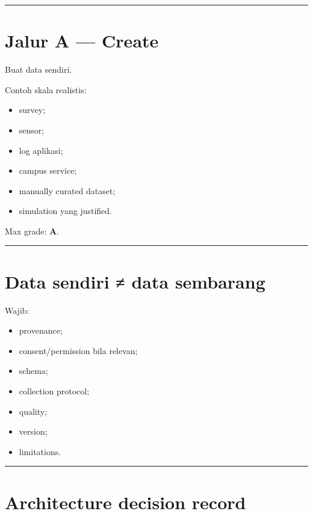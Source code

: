 \documentclass[
  indonesian,
  letterpaper,
  DIV=11,
  numbers=noendperiod]{scrreprt}
\providecommand{\tightlist}{%
  \setlength{\itemsep}{0pt}\setlength{\parskip}{0pt}}
\begin{document}
\begin{center}\rule{0.5\linewidth}{0.5pt}\end{center}

\section{Jalur A --- Create}\label{jalur-a-create-1}

Buat data sendiri.

Contoh skala realistis:

\begin{itemize}
\tightlist
\item
  survey;
\item
  sensor;
\item
  log aplikasi;
\item
  campus service;
\item
  manually curated dataset;
\item
  simulation yang justified.
\end{itemize}

Max grade: \textbf{A}.

\begin{center}\rule{0.5\linewidth}{0.5pt}\end{center}

\section{Data sendiri ≠ data
sembarang}\label{data-sendiri-data-sembarang}

Wajib:

\begin{itemize}
\tightlist
\item
  provenance;
\item
  consent/permission bila relevan;
\item
  schema;
\item
  collection protocol;
\item
  quality;
\item
  version;
\item
  limitations.
\end{itemize}

\begin{center}\rule{0.5\linewidth}{0.5pt}\end{center}

\section{Architecture decision
record}\label{architecture-decision-record}
\end{document}
